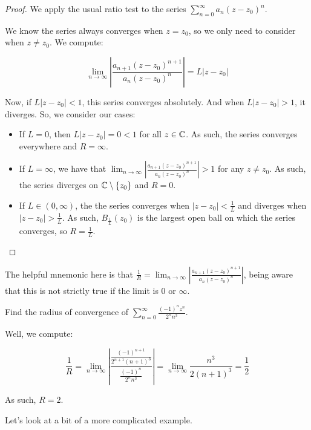 \begin{proof} We apply the usual ratio test to the series $\sum_{n = 0}^\infty a_n(z-z_0)^n$.

We know the series always converges when $z = z_0$, so we only need to consider when $z\ne z_0$. We compute:

$$\lim_{n\rightarrow\infty} \left|\frac{a_{n+1}(z-z_0)^{n+1}}{a_n(z-z_0)^n}\right| = L|z-z_0|$$

Now, if $L|z-z_0| < 1$, this series converges absolutely. And when $L|z-z_0| > 1$, it diverges. So, we consider our cases:

\begin{itemize}
\item If $L = 0$, then $L|z-z_0| = 0<1$ for all $z\in \mathbb{C}$. As such, the series converges everywhere and $R = \infty$.
\item If $L = \infty$, we have that $\lim_{n\rightarrow\infty} \left|\frac{a_{n+1}(z-z_0)^{n+1}}{a_n(z-z_0)^n}\right| > 1$ for any $z\ne z_0$. As such, the series diverges on $\mathbb{C}\setminus\{z_0\}$ and $R = 0$.
\item If $L\in (0,\infty)$, the the series converges when $|z-z_0|< \frac{1}{L}$ and diverges when $|z-z_0| > \frac{1}{L}$. As such, $B_{\frac{1}{L}}(z_0)$ is the largest open ball on which the series converges, so $R = \frac{1}{L}$.
\end{itemize}
\end{proof}


The helpful mnemonic here is that $\frac{1}{R} = \lim_{n\rightarrow\infty} \left|\frac{a_{n+1}(z-z_0)^{n+1}}{a_n(z-z_0)^n}\right|$, being aware that this is not strictly true if the limit is $0$ or $\infty$. 

\begin{ex}{}{} Find the radius of convergence of $\sum_{n = 0}^\infty \frac{(-1)^nz^n}{2^nn^3}$.

Well, we compute:

$$\frac{1}{R} = \lim_{n\rightarrow \infty} \left|\frac{\frac{(-1)^{n+1}}{2^{n+1}(n+1)^3}}{\frac{(-1)^n}{2^nn^3}}\right| = \lim_{n\rightarrow \infty} \frac{n^3}{2(n+1)^3} = \frac{1}{2}$$

As such, $R = 2$.
\end{ex}

Let's look at a bit of a more complicated example.

